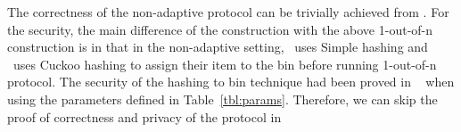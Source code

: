 The correctness of the non-adaptive \SSOT protocol can be trivially achieved from . For the security, the main difference of the construction with the above 1-out-of-n \SSOT construction is in that in the non-adaptive setting, \SS\ uses Simple hashing and \RR\ uses Cuckoo hashing to assign their item to the bin before running 1-out-of-n \SSOT protocol. The security of the hashing to bin technique had been proved in ~\cite{eprint:PSZ16} when using the parameters defined in Table~\ref{tbl:params}. Therefore, we can skip the proof of correctness and privacy of the protocol in 



%
 